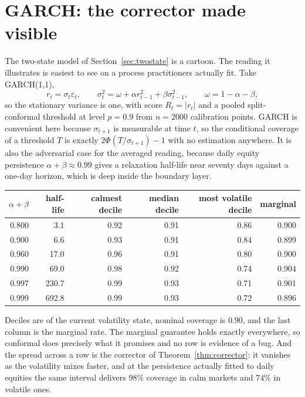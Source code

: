 \documentclass[11pt]{article}
\theoremstyle{definition}
\theoremstyle{remark}
\begin{document}
\section{GARCH: the corrector made visible}\label{sec:garch}

The two-state model of Section~\ref{sec:twostate} is a cartoon. The reading it illustrates is
easiest to see on a process practitioners actually fit. Take GARCH(1,1),
\[
  r_t = \sigma_t \varepsilon_t, \qquad
  \sigma_t^2 = \omega + \alpha r_{t-1}^2 + \beta \sigma_{t-1}^2,
  \qquad \omega = 1-\alpha-\beta ,
\]
so the stationary variance is one, with score $R_t = |r_t|$ and a pooled split-conformal threshold
at level $p=0.9$ from $n=2000$ calibration points. GARCH is convenient here because $\sigma_{t+1}$
is measurable at time $t$, so the conditional coverage of a threshold $T$ is exactly
$2\Phi(T/\sigma_{t+1})-1$ with no estimation anywhere. It is also the adversarial case for the
averaged reading, because daily equity persistence $\alpha+\beta \approx 0.99$ gives a relaxation
half-life near seventy days against a one-day horizon, which is deep inside the boundary layer.

\begin{center}
\begin{tabular}{r r r r r r}
\hline
$\alpha+\beta$ & half-life & calmest decile & median decile & most volatile decile & marginal \\
\hline
0.800 & 3.1   & 0.92 & 0.91 & 0.86 & 0.900 \\
0.900 & 6.6   & 0.93 & 0.91 & 0.84 & 0.899 \\
0.960 & 17.0  & 0.96 & 0.91 & 0.80 & 0.900 \\
0.990 & 69.0  & 0.98 & 0.92 & 0.74 & 0.904 \\
0.997 & 230.7 & 0.99 & 0.93 & 0.71 & 0.901 \\
0.999 & 692.8 & 0.99 & 0.93 & 0.72 & 0.896 \\
\hline
\end{tabular}
\end{center}

Deciles are of the current volatility state, nominal coverage is $0.90$, and the last column is the
marginal rate. The marginal guarantee holds exactly everywhere, so conformal
does precisely what it promises and no row is evidence of a bug. And the spread across a row is the
corrector of Theorem~\ref{thm:corrector}: it vanishes as the volatility mixes faster, and at the
persistence actually fitted to daily equities the same interval delivers $98\%$ coverage in calm
markets and $74\%$ in volatile ones.
\end{document}
